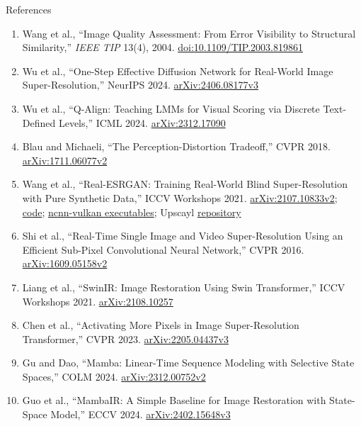 \begin{frame}[allowframebreaks=0.9]{References}
  \scriptsize
  \setlength{\parskip}{0pt}
  \begin{enumerate}\itemsep0.1em
    \item Wang et al., ``Image Quality Assessment: From Error Visibility to Structural Similarity,'' \textit{IEEE TIP} 13(4), 2004. \href{https://doi.org/10.1109/TIP.2003.819861}{doi:10.1109/TIP.2003.819861}
    \item Wu et al., ``One-Step Effective Diffusion Network for Real-World Image Super-Resolution,'' NeurIPS 2024. \href{https://arxiv.org/abs/2406.08177v3}{arXiv:2406.08177v3}
    \item Wu et al., ``Q-Align: Teaching LMMs for Visual Scoring via Discrete Text-Defined Levels,'' ICML 2024. \href{https://arxiv.org/abs/2312.17090}{arXiv:2312.17090}
    \item Blau and Michaeli, ``The Perception-Distortion Tradeoff,'' CVPR 2018. \href{https://arxiv.org/abs/1711.06077v2}{arXiv:1711.06077v2}
    \item Wang et al., ``Real-ESRGAN: Training Real-World Blind Super-Resolution with Pure Synthetic Data,'' ICCV Workshops 2021. \href{https://arxiv.org/abs/2107.10833v2}{arXiv:2107.10833v2}; \href{https://github.com/xinntao/Real-ESRGAN}{code}; \href{https://github.com/xinntao/Real-ESRGAN-ncnn-vulkan}{ncnn-vulkan executables}; Upscayl \href{https://github.com/upscayl/upscayl}{repository}
    \item Shi et al., ``Real-Time Single Image and Video Super-Resolution Using an Efficient Sub-Pixel Convolutional Neural Network,'' CVPR 2016. \href{https://arxiv.org/abs/1609.05158v2}{arXiv:1609.05158v2}
    \item Liang et al., ``SwinIR: Image Restoration Using Swin Transformer,'' ICCV Workshops 2021. \href{https://arxiv.org/abs/2108.10257}{arXiv:2108.10257}
    \item Chen et al., ``Activating More Pixels in Image Super-Resolution Transformer,'' CVPR 2023. \href{https://arxiv.org/abs/2205.04437v3}{arXiv:2205.04437v3}
    \item Gu and Dao, ``Mamba: Linear-Time Sequence Modeling with Selective State Spaces,'' COLM 2024. \href{https://arxiv.org/abs/2312.00752v2}{arXiv:2312.00752v2}
    \item Guo et al., ``MambaIR: A Simple Baseline for Image Restoration with State-Space Model,'' ECCV 2024. \href{https://arxiv.org/abs/2402.15648v3}{arXiv:2402.15648v3}

\end{enumerate}
\end{frame}
